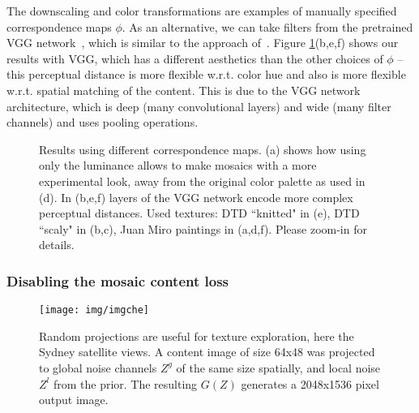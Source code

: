 \documentclass{article}
\begin{document}
The downscaling and color transformations are examples of manually specified correspondence maps $\phi$. As an alternative, we can take filters from the pretrained VGG network~\cite{Simonyan14c}, which is similar to the approach of~\cite{GatysEB15a}.
Figure \ref{fig_vgg}(b,e,f) shows our results with VGG, which has a different aesthetics than the other choices of $\phi$ -- this perceptual distance is more flexible w.r.t. color hue and also is more flexible w.r.t. spatial matching of the content. This is due to the VGG network architecture, which is deep (many convolutional layers) and wide (many filter channels) and uses pooling operations.

\begin{figure}
\centering
{}
\caption{Results using different  correspondence maps. (a) shows how using only the luminance allows to make mosaics with a more experimental look, away from the original color palette as used in (d). In (b,e,f) layers of the VGG network encode more complex perceptual distances. Used textures: DTD ``knitted" in (e), DTD ``scaly" in (b,c), Juan Miro paintings in (a,d,f). Please zoom-in for details.}
\label{fig_vgg}
\end{figure}

\subsubsection{Disabling the mosaic content loss}
\label{sec_rproj}

\begin{figure}
\centering
\texttt{[image: img/imgche]}
\caption{Random projections are useful for texture exploration, here the Sydney satellite views. A content image of size 64x48 was projected to global noise channels $Z^g$ of the same size spatially, and local noise $Z^l$ from the prior. The resulting $G(Z)$  generates a 2048x1536 pixel output image. }\label{fig_che}
\end{figure}
\end{document}
